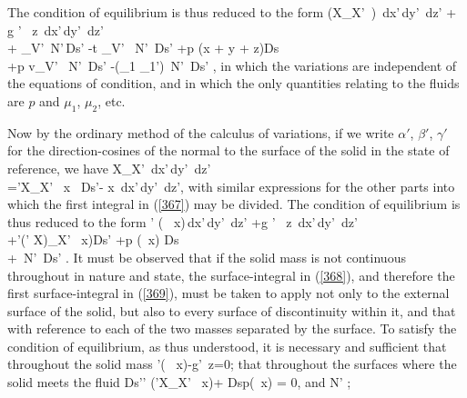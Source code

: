 \documentclass[12pt]{article}
\begin{document}
The condition of equilibrium is thus reduced to the form
\eqs \int \int \int \left(X_{X'}\, \delta {} \right) \,dx'\,dy'\, dz' + \int \int \int g \Gamma' \, \delta z \,dx'\,dy'\, dz'\\
+ \int \epsilon_{V'} \,\delta N'\,Ds' -\int t \eta_{V'} \, \delta N'\, Ds' +\int p \left(\alpha \delta x + \beta \delta y + \gamma \delta z\right)Ds\\
+\int p v_{V'} \, \delta N'\, Ds' -\int (\mu_1 \Gamma_1')\, \delta N'\, Ds'  , \label{367}\eqe
in which the variations are independent of the equations of condition, and in which the only quantities relating to the fluids are $p$ and $\mu_1$, $\mu_2$, etc.


Now by the ordinary method of the calculus of variations, if we write $\alpha'$, $\beta'$, $\gamma'$ for the direction-cosines of the normal to the surface of the solid in the state of reference, we have
\eqs \int \int \int X_{X'} \delta {} \,dx'\,dy'\, dz'\\
=\int \alpha'X_{X'} \, \delta x \, Ds'-\int \int \int  {} \delta x \,dx'\,dy'\, dz', \label{368}\eqe
with similar expressions for the other parts into which the first integral in (\ref{367}) may be divided. The condition of equilibrium is thus reduced to the form
\eqs \int \int \int \sum \sum\nolimits' \left(  \, \delta x\right)\,dx'\,dy'\, dz' 
+\int \int \int g \Gamma' \, \delta z \,dx'\,dy'\, dz'\\
+\int \sum \sum\nolimits'(\alpha' X)_{X'} \, \delta x)Ds' +\int p \sum (\alpha \, \delta x) Ds\\
+\int {} \, \delta N'\, Ds' .   \label{369}\eqe
It must be observed that if the solid mass is not continuous throughout in nature and state, the surface-integral in (\ref{368}), and therefore the first surface-integral in (\ref{369}), must be taken to apply not only to the external surface of the solid, but also to every surface of discontinuity within it, and that with reference to each of the two masses separated by the surface. To satisfy the condition of equilibrium, as thus understood, it is necessary and sufficient that throughout the solid mass
\eqs \sum \sum\nolimits'\left(  \, \delta x\right)-g\Gamma' \,\delta z=0;       \label{370}\eqe
that throughout the surfaces where the solid meets the fluid
\eqs Ds'\sum \sum\nolimits' (\alpha'X_{X'} \, \delta x)+ Dsp\sum(\alpha \, \delta x) = 0,  \label{371}\eqe
and   \eqs {} \delta N' ; \label{372}\eqe
\end{document}
